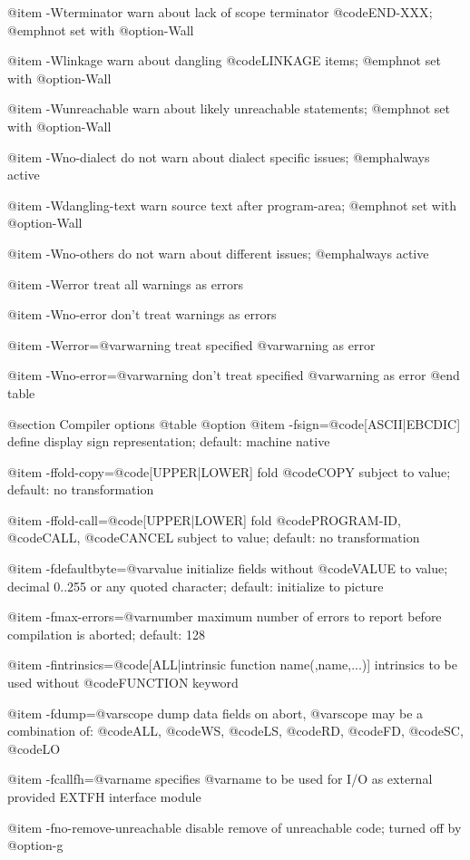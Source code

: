 @item -Wterminator
warn about lack of scope terminator @code{END-XXX}; @emph{not} set with @option{-Wall}

@item -Wlinkage
warn about dangling @code{LINKAGE} items; @emph{not} set with @option{-Wall}

@item -Wunreachable
warn about likely unreachable statements; @emph{not} set with @option{-Wall}

@item -Wno-dialect
do not warn about dialect specific issues; @emph{always} active

@item -Wdangling-text
warn source text after program-area; @emph{not} set with @option{-Wall}

@item -Wno-others
do not warn about different issues; @emph{always} active

@item -Werror
treat all warnings as errors

@item -Wno-error
don't treat warnings as errors

@item -Werror=@var{warning}
treat specified @var{warning} as error

@item -Wno-error=@var{warning}
don't treat specified @var{warning} as error
@end table

@section Compiler options
@table @option
@item -fsign=@code{[ASCII|EBCDIC]}
define display sign representation; default: machine native

@item -ffold-copy=@code{[UPPER|LOWER]}
fold @code{COPY} subject to value; default: no transformation

@item -ffold-call=@code{[UPPER|LOWER]}
fold @code{PROGRAM-ID}, @code{CALL}, @code{CANCEL} subject to value; default: no transformation

@item -fdefaultbyte=@var{value}
initialize fields without @code{VALUE} to value; decimal 0..255 or any quoted character; default: initialize to picture

@item -fmax-errors=@var{number}
maximum number of errors to report before
compilation is aborted; default: 128

@item -fintrinsics=@code{[ALL}|intrinsic function name(,name,...)]
intrinsics to be used without @code{FUNCTION} keyword

@item -fdump=@var{scope}
dump data fields on abort, @var{scope} may be
a combination of: @code{ALL}, @code{WS}, @code{LS}, @code{RD}, @code{FD}, @code{SC}, @code{LO}

@item -fcallfh=@var{name}
specifies @var{name} to be used for I/O
as external provided EXTFH interface module

@item -fno-remove-unreachable
disable remove of unreachable code; turned off by @option{-g}


